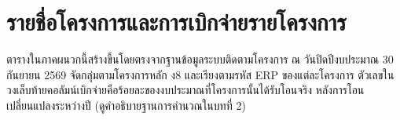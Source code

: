 \chapter{รายชื่อโครงการและการเบิกจ่ายรายโครงการ}

ตารางในภาคผนวกนี้สร้างขึ้นโดยตรงจากฐานข้อมูลระบบติดตามโครงการ ณ วันปิดปีงบประมาณ 30 กันยายน 2569
จัดกลุ่มตามโครงการหลัก ง8 และเรียงตามรหัส ERP ของแต่ละโครงการ
ตัวเลขในวงเล็บท้ายคอลัมน์เบิกจ่ายคือร้อยละของงบประมาณที่โครงการนั้นได้รับโอนจริง
หลังการโอนเปลี่ยนแปลงระหว่างปี (ดูคำอธิบายฐานการคำนวณในบทที่ 2)


